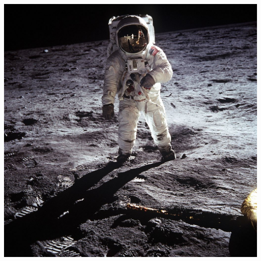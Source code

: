 \vspace*{\fill}
\begin{center}
	\includegraphics[width=.9\textwidth]{images/Aldrin_Apollo_11}
    \label{image:buzzaldrin}
\end{center}
\vspace*{\fill}




